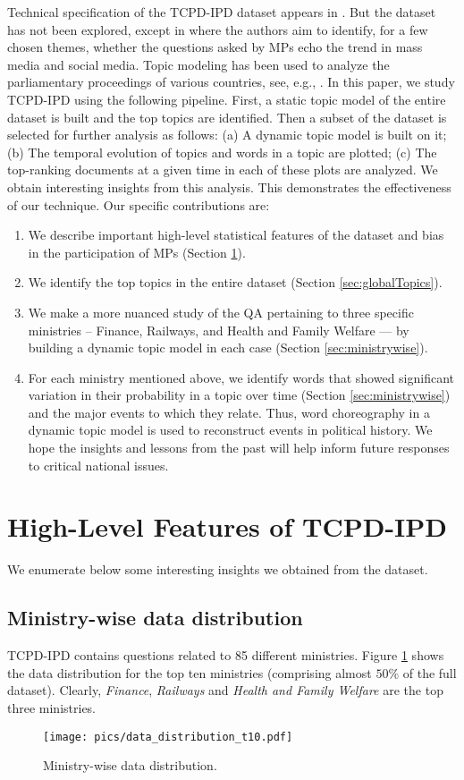 \documentclass[10pt, a4paper]{article}
\begin{document}
Technical specification of the TCPD-IPD dataset appears in \cite{saloni2019tpcd}. But the dataset has not been explored, except in \cite{sen2019studying} where the authors aim to identify, for a few chosen themes, whether the questions asked by MPs echo the trend in mass media and social media. Topic modeling has been used to analyze the parliamentary proceedings of various countries, see, e.g., \cite{greene2017exploring,gkoumas2018exploring,ishima2020electoral}. 
In this paper, we study TCPD-IPD using the following pipeline. First, a static topic model of the entire dataset is built and the top topics are identified. Then a subset of the dataset is selected for further analysis as follows: (a) A dynamic topic model is built on it; (b) The temporal evolution of topics and words in a topic are plotted; (c) The top-ranking documents at a given time in each of these plots are analyzed. We obtain interesting insights from this analysis. This demonstrates the effectiveness of our technique. Our specific contributions are: 
\begin{enumerate}
    \item We describe important high-level statistical features of the dataset and bias in the participation of MPs (Section  \ref{sec:dataset}).
    \item We identify the top topics in the entire dataset (Section \ref{sec:globalTopics}).
    \item We make a more nuanced study of the QA pertaining to three specific ministries -- Finance, Railways, and Health and Family Welfare --- by building a dynamic topic model in each case (Section \ref{sec:ministrywise}).
    \item For each ministry mentioned above, we identify  words that showed significant variation in their probability in a topic over time (Section \ref{sec:ministrywise}) and the major events to which they relate. Thus, word choreography in a dynamic topic model is used to reconstruct events in political history. We hope the insights and lessons from the past will help inform future responses to critical national issues.
\end{enumerate}

\section{High-Level Features of TCPD-IPD}
\label{sec:dataset}
We enumerate below some interesting insights we obtained from the dataset.
    \subsection{Ministry-wise data distribution}
    TCPD-IPD contains questions related to 85 different ministries. Figure \ref{fig:EDA_dataDist_t10} shows the data distribution for the top ten ministries (comprising almost $50\%$ of the full dataset). Clearly, \textit{Finance}, \textit{Railways} and \textit{Health and Family Welfare} are the top three ministries.
        \begin{figure} [!htbp]
        \centering
        \texttt{[image: pics/data\_distribution\_t10.pdf]}
        \caption{Ministry-wise data distribution.} 
        \label{fig:EDA_dataDist_t10}
        \end{figure}
\end{document}
